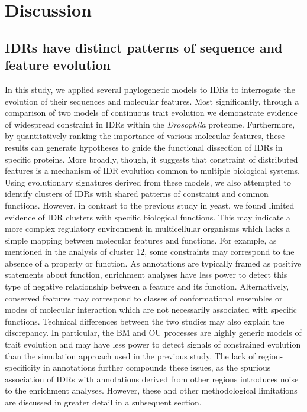 \section{Discussion}
\subsection{IDRs have distinct patterns of sequence and feature evolution}
In this study, we applied several phylogenetic models to IDRs to interrogate the evolution of their sequences and molecular features. Most significantly, through a comparison of two models of continuous trait evolution we demonstrate evidence of widespread constraint in IDRs within the \textit{Drosophila} proteome. Furthermore, by quantitatively ranking the importance of various molecular features, these results can generate hypotheses to guide the functional dissection of IDRs in specific proteins. More broadly, though, it suggests that constraint of distributed features is a mechanism of IDR evolution common to multiple biological systems. Using evolutionary signatures derived from these models, we also attempted to identify clusters of IDRs with shared patterns of constraint and common functions. However, in contrast to the previous study in yeast, we found limited evidence of IDR clusters with specific biological functions. This may indicate a more complex regulatory environment in multicellular organisms which lacks a simple mapping between molecular features and functions. For example, as mentioned in the analysis of cluster 12, some constraints may correspond to the absence of a property or function. As annotations are typically framed as positive statements about function, enrichment analyses have less power to detect this type of negative relationship between a feature and its function. Alternatively, conserved features may correspond to classes of conformational ensembles or modes of molecular interaction which are not necessarily associated with specific functions. Technical differences between the two studies may also explain the discrepancy. In particular, the BM and OU processes are highly generic models of trait evolution and may have less power to detect signals of constrained evolution than the simulation approach used in the previous study. The lack of region-specificity in annotations further compounds these issues, as the spurious association of IDRs with annotations derived from other regions introduces noise to the enrichment analyses. However, these and other methodological limitations are discussed in greater detail in a subsequent section.

